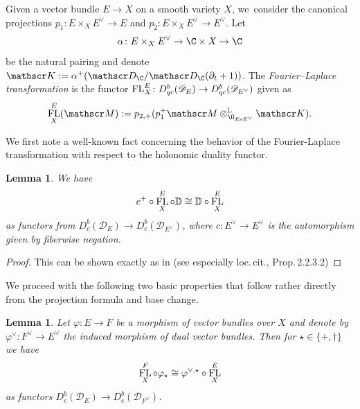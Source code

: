 \documentclass[JEP,XML,SOM,Unicode,published]{cedram}
\newtheorem{lem}[thm]{Lemma}
\newcommand{\bD}{{\mathbb D}}\let\mbd\bD
\newcommand{\cD}{\mathscr{D}}
\DeclareMathOperator{\FL}{\textup{FL}}
\newcommand\defstyle[1]{\emph{#1}}
\begin{document}
\begin{dfn}
Given a vector bundle $E \to X$ on a smooth variety $X$, we~consider the canonical projections $p_1 \colon E \times_X E^\vee \to E$ and $p_2 \colon E \times_X E^\vee \to E^\vee$. Let
\[
\alpha \colon E \times_X E^\vee \to \C \times X \to \C
\]
be the natural pairing and denote $\mathscr K := \alpha^+(\mathscr D_\C/\mathscr D_\C(\partial_t+1))$.
The \defstyle{Fourier--Laplace transformation} is the functor $\FL_X^E \colon D_{qc}^b(\mathscr D_E) \to D_{qc}^b(\mathscr D_{E^\vee})$ given as
\[
\FL_X^E(\mathscr M) := p_{2,+} (p_1^+ \mathscr M \otimes^{\mathbb L}_{\O_{E\!\times\!E^\vee}} \mathscr K).\qedhere
\]
\end{dfn}

We first note a well-known fact concerning the behavior of the Fourier-Laplace transformation with respect to the holonomic duality functor.

\begin{lem}\label{lem:DualFourier}
We have
\[
c^+ \circ \FL_X^E \circ \bD \cong \bD \circ \FL_X^E
\]
as functors from $D^b_c(\cD_E) \to D^b_c(\cD_{E^\vee})$,
where $c:E^\vee \to E^\vee$ is the
automorphism given by fiberwise negation.
\end{lem}

\begin{proof}
This can be shown exactly as in \cite[Cor.\,2.2.2.1., 4)]{Daia} (see especially loc.\,cit., Prop.\,2.2.3.2)
\end{proof}

We proceed with the following two basic properties that follow rather directly from the projection formula and base change.

\begin{lem} \label{lem:FLBundleMorphism}
Let $\varphi \colon E \to F$ be a morphism of vector bundles over $X$ and denote by $\varphi^\vee \colon F^\vee \to E^\vee$ the induced morphism of dual vector bundles. Then for $\star\in\{+,\dag\}$ we have
\[
\FL_X^F \circ \varphi_\star \cong \varphi^{\vee,\star} \circ \FL_X^E
\]
as functors $D_{c}^b(\mathscr D_E) \to D_{c}^b(\mathscr D_{F^\vee})$.
\end{lem}
\end{document}
